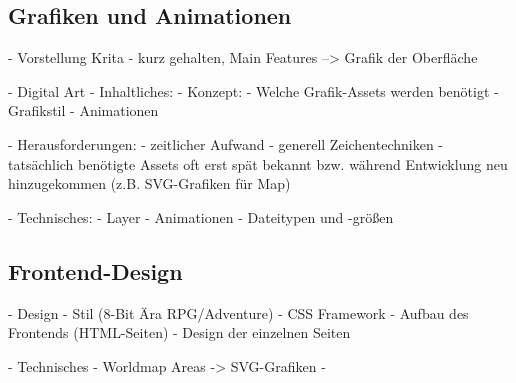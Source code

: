 

\subsection{Grafiken und Animationen}







- Vorstellung Krita
    - kurz gehalten, Main Features --> Grafik der Oberfläche

- Digital Art
    - Inhaltliches:
        - Konzept:
            - Welche Grafik-Assets werden benötigt
            - Grafikstil
            - Animationen
        
        - Herausforderungen: 
            - zeitlicher Aufwand 
            - generell Zeichentechniken
            - tatsächlich benötigte Assets oft erst spät bekannt bzw. während Entwicklung neu hinzugekommen (z.B. SVG-Grafiken für Map)
    
    - Technisches:
        - Layer
        - Animationen
        - Dateitypen und -größen


\subsection{Frontend-Design}
    - Design
        - Stil (8-Bit Ära RPG/Adventure)
        - CSS Framework
        - Aufbau des Frontends (HTML-Seiten)
        - Design der einzelnen Seiten 

    - Technisches
        - Worldmap Areas -> SVG-Grafiken
        - 